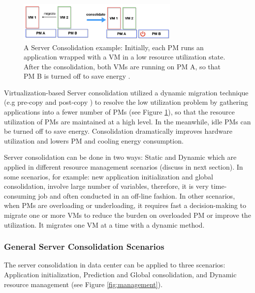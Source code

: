 \begin{figure}
	\centering
	\includegraphics[width=0.7\textwidth]{pics/consolidate.png}
	\caption{A Server Consolidation example: Initially, each PM runs an application wrapped with a VM in a low resource utilization state. After the consolidation, both VMs are running on PM A, so that PM B is turned off to save energy \cite{Barroso:2007jt}.}
	\label{fig:consolidation}
\end{figure}

Virtualization-based Server consolidation \cite{Zhang:2010vo} utilized a dynamic migration technique (e.g pre-copy \cite{Clark:2005ud} and post-copy \cite{Hines:2009fv}) to resolve the low utilization problem by gathering applications into a fewer number of PMs (see Figure \ref{fig:consolidation}), so that the resource utilization of PMs are maintained at a high level. In the meanwhile, idle PMs can be turned off to save energy. Consolidation dramatically improves hardware utilization and lowers PM and cooling energy consumption. 

Server consolidation can be done in two ways: Static and Dynamic \cite{Xiao:2015ik, Verma:2009wi} which are applied in different resource management scenarios (discuss in next section). In some scenarios, for example: new application initialization and global consolidation, involve large number of variables, therefore, it is very time-consuming job and often conducted in an off-line fashion. In other scenarios, when PMs are overloading or underloading, it requires fast a decision-making to migrate one or more VMs to reduce the burden on overloaded PM or improve the utilization. It migrates one VM at a time with a dynamic method. 



\subsubsection{General Server Consolidation Scenarios}
\label{scenarios}

The server consolidation in data center can be applied to three \cite{Svard:2015ic, Mishra:2012kx} scenarios: Application initialization, Prediction and Global consolidation, and Dynamic resource management (see Figure \ref{fig:management}). 

